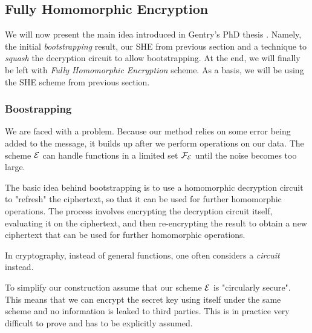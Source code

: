 \subsection{Fully Homomorphic Encryption}
We will now present the main idea introduced in Gentry's PhD thesis \cite{gentry_phd}. Namely, the initial \textit{bootstrapping} result, our SHE from previous section and a technique to \textit{squash} the decryption circuit to allow bootstrapping. At the end, we will finally be left with \textit{Fully Homomorphic Encryption} scheme. As a basis, we will be using the SHE scheme from previous section.

\subsubsection*{Boostrapping}
We are faced with a problem. Because our method relies on some error being added to the message, it builds up after we perform operations on our data. The scheme $\mathcal{E}$ can handle functions in a limited set $\mathcal{F}_{\mathcal{E}}$ until the noise becomes too large.

The basic idea behind bootstrapping is to use a homomorphic decryption circuit to "refresh" the ciphertext, so that it can be used for further homomorphic operations. The process involves encrypting the decryption circuit itself, evaluating it on the ciphertext, and then re-encrypting the result to obtain a new ciphertext that can be used for further homomorphic operations.

\begin{remark}
	In cryptography, instead of general functions, one often considers a \textit{circuit} instead. 
\end{remark}
To simplify our construction assume that our scheme $\mathcal{E}$ is "circularly secure". This means that we can encrypt the secret key using itself under the same scheme and no information is leaked to third parties. This is in practice very difficult to prove and has to be explicitly assumed. 
